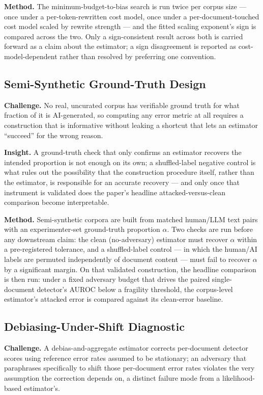 \documentclass[11pt]{article}
\begin{document}
\textbf{Method.} The minimum-budget-to-bias search is run twice per corpus size --- once under a per-token-rewritten cost model, once under a per-document-touched cost model scaled by rewrite strength --- and the fitted scaling exponent's sign is compared across the two. Only a sign-consistent result across both is carried forward as a claim about the estimator; a sign disagreement is reported as cost-model-dependent rather than resolved by preferring one convention.

\subsection{Semi-Synthetic Ground-Truth Design}
\textbf{Challenge.} No real, uncurated corpus has verifiable ground truth for what fraction of it is AI-generated, so computing any error metric at all requires a construction that is informative without leaking a shortcut that lets an estimator ``succeed'' for the wrong reason.

\textbf{Insight.} A ground-truth check that only confirms an estimator recovers the intended proportion is not enough on its own; a shuffled-label negative control is what rules out the possibility that the construction procedure itself, rather than the estimator, is responsible for an accurate recovery --- and only once that instrument is validated does the paper's headline attacked-versus-clean comparison become interpretable.

\textbf{Method.} Semi-synthetic corpora are built from matched human/LLM text pairs with an experimenter-set ground-truth proportion $\alpha$. Two checks are run before any downstream claim: the clean (no-adversary) estimator must recover $\alpha$ within a pre-registered tolerance, and a shuffled-label control --- in which the human/AI labels are permuted independently of document content --- must fail to recover $\alpha$ by a significant margin. On that validated construction, the headline comparison is then run: under a fixed adversary budget that drives the paired single-document detector's AUROC below a fragility threshold, the corpus-level estimator's attacked error is compared against its clean-error baseline.

\subsection{Debiasing-Under-Shift Diagnostic}
\textbf{Challenge.} A debias-and-aggregate estimator corrects per-document detector scores using reference error rates assumed to be stationary; an adversary that paraphrases specifically to shift those per-document error rates violates the very assumption the correction depends on, a distinct failure mode from a likelihood-based estimator's.
\end{document}
